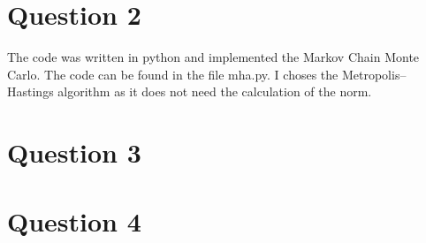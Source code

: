 \documentclass{article}
\begin{document}
\section{Question 2}

The code was written in python and implemented the Markov Chain Monte Carlo. The code can be found in the file mha.py. I choses the Metropolis–Hastings algorithm as it does not need the calculation of the norm. 

\section{Question 3}


\section{Question 4}




{}%
\end{document}
